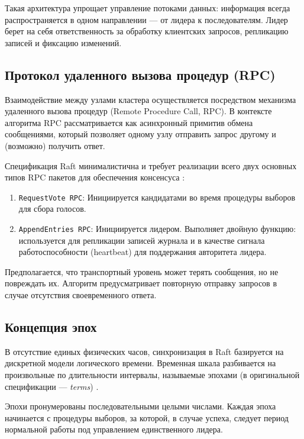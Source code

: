Такая архитектура упрощает управление потоками данных: информация всегда распространяется в одном направлении — от лидера к последователям. Лидер берет на себя ответственность за обработку клиентских запросов, репликацию записей и фиксацию изменений.

\subsection{Протокол удаленного вызова процедур (RPC)}

Взаимодействие между узлами кластера осуществляется посредством механизма удаленного вызова процедур (Remote Procedure Call, RPC). В контексте алгоритма RPC рассматривается как асинхронный примитив обмена сообщениями, который позволяет одному узлу отправить запрос другому и (возможно) получить ответ.

Спецификация Raft минималистична и требует реализации всего двух основных типов RPC пакетов для обеспечения консенсуса \cite{raft_original}:
\begin{enumerate}
    \item \texttt{RequestVote RPC}: Инициируется кандидатами во время процедуры выборов для сбора голосов.
    \item \texttt{AppendEntries RPC}: Инициируется лидером. Выполняет двойную функцию: используется для репликации записей журнала и в качестве сигнала работоспособности (heartbeat) для поддержания авторитета лидера.
\end{enumerate}

Предполагается, что транспортный уровень может терять сообщения, но не повреждать их. Алгоритм предусматривает повторную отправку запросов в случае отсутствия своевременного ответа.

\subsection{Концепция эпох}

В отсутствие единых физических часов, синхронизация в Raft базируется на дискретной модели логического времени. Временная шкала разбивается на произвольные по длительности интервалы, называемые эпохами (в оригинальной спецификации — \textit{terms}) \cite{raft_original,raft_dissertation}.

Эпохи пронумерованы последовательными целыми числами. Каждая эпоха начинается с процедуры выборов, за которой, в случае успеха, следует период нормальной работы под управлением единственного лидера.

